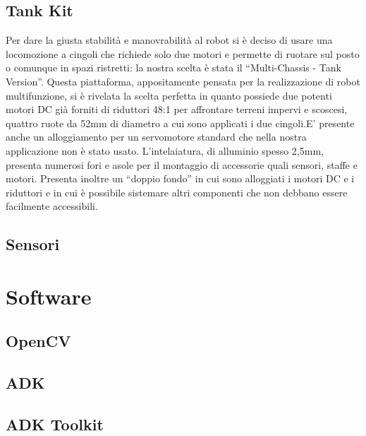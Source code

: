 \subsection {Tank Kit}
Per dare la giusta stabilità e manovrabilità al robot si è deciso di usare una locomozione a cingoli che richiede solo due motori e permette di ruotare sul posto o comunque in spazi ristretti: la nostra scelta è stata il ``Multi-Chassis - Tank Version''. Questa piattaforma, appositamente pensata per la realizzazione di robot multifunzione, si è rivelata la scelta perfetta in quanto possiede due potenti motori DC già forniti di riduttori 48:1 per affrontare terreni impervi e scoscesi, quattro ruote da 52mm di diametro a cui sono applicati i due cingoli.E' presente anche un alloggiamento per un servomotore standard che nella nostra applicazione non è stato usato. L'intelaiatura, di alluminio spesso 2,5mm, presenta numerosi fori e asole per il montaggio di accessorie quali sensori, staffe e motori. Presenta inoltre un ``doppio fondo'' in cui sono alloggiati i motori DC e i riduttori e in cui è possibile sistemare altri componenti che non debbano essere facilmente accessibili.
\subsection {Sensori}
\subsubsection{}

\section{Software}
\subsection {OpenCV}
\subsection {ADK}
\subsection {ADK Toolkit}
